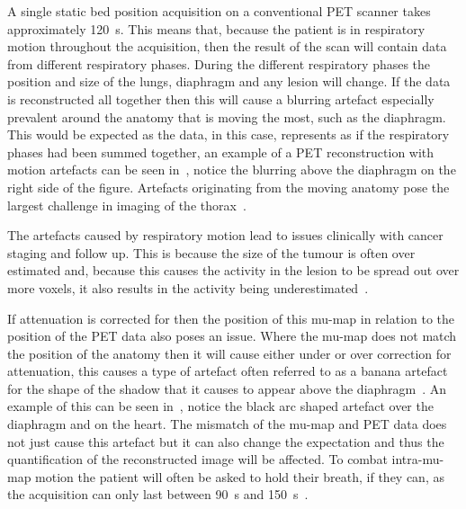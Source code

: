            A single static bed position acquisition on a conventional \gls{PET} scanner takes approximately \SI{120}{\second}. This means that, because the patient is in respiratory motion throughout the acquisition, then the result of the scan will contain data from different respiratory phases. During the different respiratory phases the position and size of the lungs, diaphragm and any lesion will change. If the data is reconstructed all together then this will cause a blurring artefact especially prevalent around the anatomy that is moving the most, such as the diaphragm. This would be expected as the data, in this case, represents as if the respiratory phases had been summed together, an example of a \gls{PET} reconstruction with motion artefacts can be seen in~, notice the blurring above the diaphragm on the right side of the figure. Artefacts originating from the moving anatomy pose the largest challenge in imaging of the thorax~.
            
            The artefacts caused by respiratory motion lead to issues clinically with cancer staging and follow up. This is because the size of the tumour is often over estimated and, because this causes the activity in the lesion to be spread out over more voxels, it also results in the activity being underestimated~.
            
            If attenuation is corrected for then the position of this \gls{mu-map} in relation to the position of the \gls{PET} data also poses an issue. Where the \gls{mu-map} does not match the position of the anatomy then it will cause either under or over correction for attenuation, this causes a type of artefact often referred to as a banana artefact for the shape of the shadow that it causes to appear above the diaphragm~. An example of this can be seen in~, notice the black arc shaped artefact over the diaphragm and on the heart. The mismatch of the \gls{mu-map} and \gls{PET} data does not just cause this artefact but it can also change the expectation and thus the quantification of the reconstructed image will be affected. To combat intra-\gls{mu-map} motion the patient will often be asked to hold their breath, if they can, as the acquisition can only last between \SI{90}{\second} and \SI{150}{\second}~.
            
